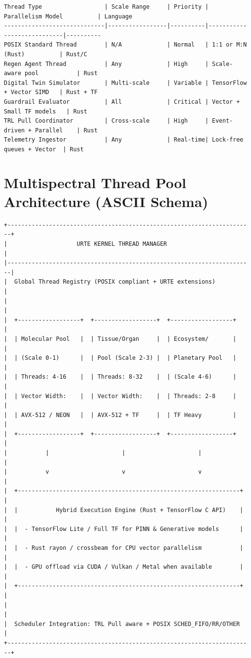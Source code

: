 \documentclass[11pt,a4paper]{report}
\begin{document}
\begin{lstlisting}[style=kernelschema, caption={URTE Multispectral Thread Types}]
Thread Type                  | Scale Range     | Priority | Parallelism Model          | Language
-----------------------------|-----------------|----------|----------------------------|----------
POSIX Standard Thread        | N/A             | Normal   | 1:1 or M:N (Rust)          | Rust/C
Regen Agent Thread           | Any             | High     | Scale-aware pool           | Rust
Digital Twin Simulator       | Multi-scale     | Variable | TensorFlow + Vector SIMD   | Rust + TF
Guardrail Evaluator          | All             | Critical | Vector + Small TF models   | Rust
TRL Pull Coordinator         | Cross-scale     | High     | Event-driven + Parallel    | Rust
Telemetry Ingestor           | Any             | Real-time| Lock-free queues + Vector  | Rust
\end{lstlisting}

\section{Multispectral Thread Pool Architecture (ASCII Schema)}

\begin{lstlisting}[style=kernelschema, caption={Multispectral Thread Pool Manager}]
+-----------------------------------------------------------------------+
|                    URTE KERNEL THREAD MANAGER                         |
|-----------------------------------------------------------------------|
|  Global Thread Registry (POSIX compliant + URTE extensions)           |
|                                                                       |
|  +------------------+  +------------------+  +------------------+     |
|  | Molecular Pool   |  | Tissue/Organ     |  | Ecosystem/       |     |
|  | (Scale 0-1)      |  | Pool (Scale 2-3) |  | Planetary Pool   |     |
|  | Threads: 4-16    |  | Threads: 8-32    |  | (Scale 4-6)      |     |
|  | Vector Width:    |  | Vector Width:    |  | Threads: 2-8     |     |
|  | AVX-512 / NEON   |  | AVX-512 + TF     |  | TF Heavy         |     |
|  +------------------+  +------------------+  +------------------+     |
|           |                     |                     |               |
|           v                     v                     v               |
|  +----------------------------------------------------------------+   |
|  |           Hybrid Execution Engine (Rust + TensorFlow C API)    |   |
|  |  - TensorFlow Lite / Full TF for PINN & Generative models      |   |
|  |  - Rust rayon / crossbeam for CPU vector parallelism           |   |
|  |  - GPU offload via CUDA / Vulkan / Metal when available        |   |
|  +----------------------------------------------------------------+   |
|                                                                       |
|  Scheduler Integration: TRL Pull aware + POSIX SCHED_FIFO/RR/OTHER   |
+-----------------------------------------------------------------------+
\end{lstlisting}
\end{document}
